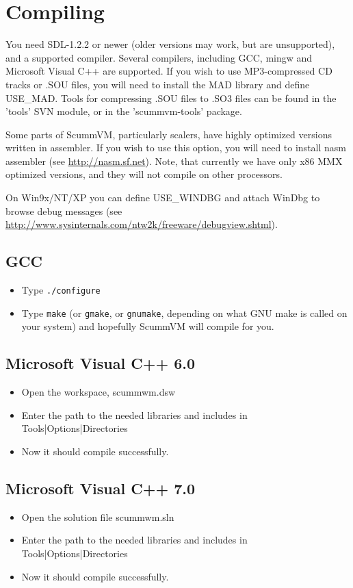 


\section{Compiling}

You need SDL-1.2.2 or newer (older versions may work, but are unsupported), and
a supported compiler. Several compilers, including GCC, mingw and Microsoft
Visual C++ are supported. If you wish to use MP3-compressed CD tracks or
.SOU files, you will need to install the MAD library and define
USE\_MAD. Tools for compressing .SOU files to .SO3 files can be
found in the 'tools' SVN module, or in the 'scummvm-tools' package.

Some parts of ScummVM, particularly scalers, have highly optimized versions 
written in assembler. If you wish to use this option, you will need to install 
nasm assembler (see \url{http://nasm.sf.net}). Note, that currently we have only x86
MMX optimized versions, and they will not compile on other processors.

On Win9x/NT/XP you can define USE\_WINDBG and attach WinDbg to browse debug 
messages (see \url{http://www.sysinternals.com/ntw2k/freeware/debugview.shtml}).

\subsection{GCC}
  \begin{itemize}
  \item Type \texttt{./configure}
  \item Type \texttt{make} (or \texttt{gmake}, or \texttt{gnumake}, depending
        on what GNU make is called on your system) and hopefully ScummVM will
        compile for you.
  \end{itemize}
\subsection{Microsoft Visual C++ 6.0}
  \begin{itemize}
  \item Open the workspace, scummwm.dsw
  \item Enter the path to the needed libraries and includes in
    Tools|Options|Directories
  \item Now it should compile successfully. 
  \end{itemize}
\subsection{Microsoft Visual C++ 7.0}
  \begin{itemize}
  \item Open the solution file scummwm.sln
  \item Enter the path to the needed libraries and includes in
    Tools|Options|Directories
  \item Now it should compile successfully. 
  \end{itemize}
